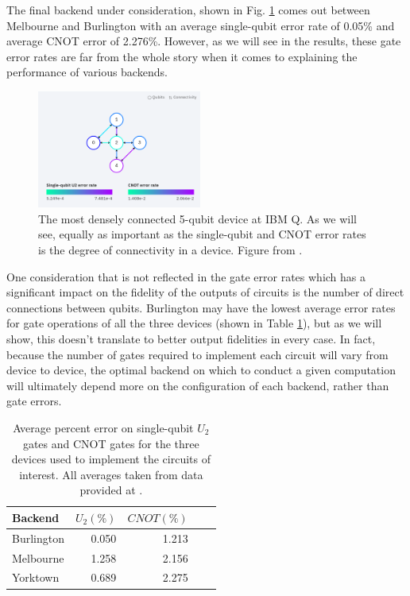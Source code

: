The final backend under consideration, shown in Fig.
\ref{fig:yorktown_connections} comes out between Melbourne and Burlington with
an average single-qubit error rate of 0.05\% and average CNOT error of 2.276\%.
However, as we will see in the results, these gate error rates are far from the
whole story when it comes to explaining the performance of various backends.

\begin{figure}[h]
  \includegraphics[width=0.48\textwidth]{images/connection_diagram_ibmqx2.png}
  \caption{The most densely connected 5-qubit device at IBM Q. As we will see,
    equally as important as the single-qubit and CNOT error rates is the degree
    of connectivity in a device. Figure from \cite{ibmq_yorktown}.}
  \label{fig:yorktown_connections}
\end{figure}

One consideration that is not reflected in the gate error rates which has a
significant impact on the fidelity of the outputs of circuits is the number of direct
connections between qubits. Burlington may have the lowest average error rates
for gate operations of all the three devices (shown in Table
\ref{tb:average_errors}), but as we will show, this doesn't translate to better
output fidelities in every case. In fact, because the number of gates required
to implement each circuit will vary from device to device, the optimal backend
on which to conduct a given computation will ultimately depend more on the
configuration of each backend, rather than gate errors.

\begin{table} \centering
  \begin{tabular}{lrrrr}
    \toprule
    Backend & $U_2 (\%)$ & $CNOT (\%)$ \\
    \midrule
    Burlington & 0.050 & 1.213 \\
    Melbourne & 1.258 & 2.156 \\
    Yorktown & 0.689 & 2.275 \\
    \bottomrule
  \end{tabular}
  \caption{Average percent error on single-qubit $U_2$ gates and CNOT gates for the
    three devices used to implement the circuits of interest. All averages taken
    from data provided at \cite{ibmq_burlington,ibmq_16_melbourne,ibmq_yorktown}.}
  \label{tb:average_errors}
\end{table}

